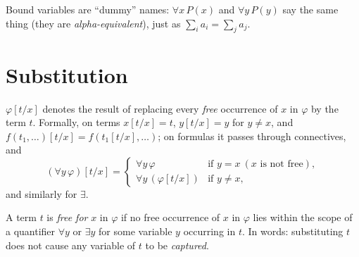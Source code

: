 Bound variables are ``dummy'' names: $\forall x\,P(x)$ and $\forall y\,P(y)$ say the same
thing (they are \emph{alpha-equivalent}), just as $\sum_i a_i = \sum_j a_j$.

\section{Substitution}

\begin{definition}[Substitution]
$\varphi[t/x]$ denotes the result of replacing every \emph{free} occurrence of $x$ in
$\varphi$ by the term $t$. Formally, on terms $x[t/x]=t$, $y[t/x]=y$ for $y\ne x$, and
$f(t_1,\dots)[t/x]=f(t_1[t/x],\dots)$; on formulas it passes through connectives, and
\[
  (\forall y\,\varphi)[t/x] =
  \begin{cases}
   \forall y\,\varphi & \text{if } y=x \ (\text{$x$ is not free}),\\
   \forall y\,(\varphi[t/x]) & \text{if } y\ne x,
  \end{cases}
\]
and similarly for $\exists$.
\end{definition}

\begin{definition}
A term $t$ is \emph{free for} $x$ in $\varphi$ if no free occurrence of $x$ in $\varphi$ lies
within the scope of a quantifier $\forall y$ or $\exists y$ for some variable $y$ occurring
in $t$. In words: substituting $t$ does not cause any variable of $t$ to be
\emph{captured}.
\end{definition}

